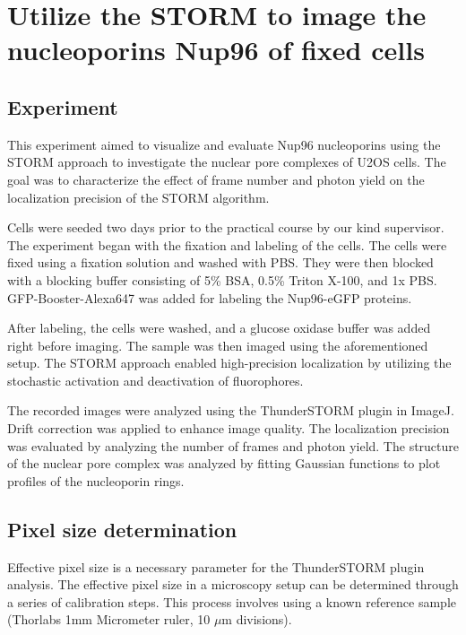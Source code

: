 \documentclass[a4paper,english,12pt,bibliography=totoc]{scrreprt}
\begin{document}
\chapter{Utilize the STORM to image the nucleoporins Nup96 of fixed cells}


\section{Experiment}


This experiment aimed to visualize and evaluate Nup96 nucleoporins using the STORM approach to investigate the nuclear pore complexes of U2OS cells. The goal was to characterize the effect of frame number and photon yield on the localization precision of the STORM algorithm.

Cells were seeded two days prior to the practical course by our kind supervisor. The experiment began with the fixation and labeling of the cells. The cells were fixed using a fixation solution and washed with PBS. They were then blocked with a blocking buffer consisting of 5\% BSA, 0.5\% Triton X-100, and 1x PBS. GFP-Booster-Alexa647 was added for labeling the Nup96-eGFP proteins.

After labeling, the cells were washed, and a glucose oxidase buffer was added right before imaging. The sample was then imaged using the aforementioned setup. The STORM approach enabled high-precision localization by utilizing the stochastic activation and deactivation of fluorophores.

The recorded images were analyzed using the ThunderSTORM plugin in ImageJ. Drift correction was applied to enhance image quality. The localization precision was evaluated by analyzing the number of frames and photon yield. The structure of the nuclear pore complex was analyzed by fitting Gaussian functions to plot profiles of the nucleoporin rings.

\section{Pixel size determination}
Effective pixel size is a necessary parameter for the ThunderSTORM plugin analysis. The effective pixel size in a microscopy setup can be determined through a series of calibration steps. This process involves using a known reference sample (Thorlabs 1mm Micrometer ruler, 10 $\mu$m divisions).
\end{document}
